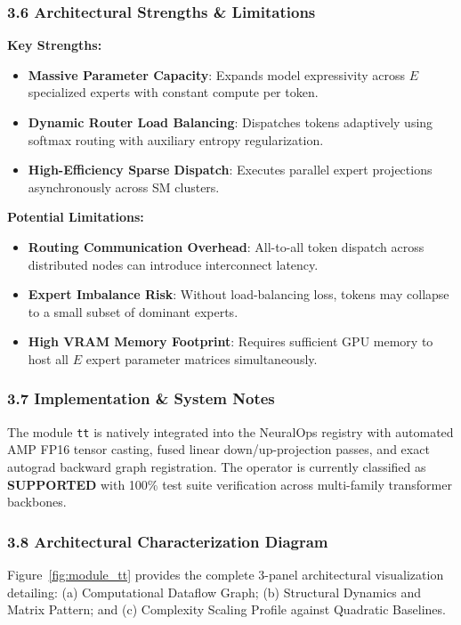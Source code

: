 \subsubsection*{3.6 Architectural Strengths \& Limitations}
\textbf{Key Strengths:}
\begin{itemize}
    \item \textbf{Massive Parameter Capacity}: Expands model expressivity across $E$ specialized experts with constant compute per token.
    \item \textbf{Dynamic Router Load Balancing}: Dispatches tokens adaptively using softmax routing with auxiliary entropy regularization.
    \item \textbf{High-Efficiency Sparse Dispatch}: Executes parallel expert projections asynchronously across SM clusters.
\end{itemize}

\textbf{Potential Limitations:}
\begin{itemize}
    \item \textbf{Routing Communication Overhead}: All-to-all token dispatch across distributed nodes can introduce interconnect latency.
    \item \textbf{Expert Imbalance Risk}: Without load-balancing loss, tokens may collapse to a small subset of dominant experts.
    \item \textbf{High VRAM Memory Footprint}: Requires sufficient GPU memory to host all $E$ expert parameter matrices simultaneously.
\end{itemize}

\subsubsection*{3.7 Implementation \& System Notes}
The module \texttt{tt} is natively integrated into the NeuralOps registry with automated AMP FP16 tensor casting, fused linear down/up-projection passes, and exact autograd backward graph registration. The operator is currently classified as \textbf{SUPPORTED} with 100\% test suite verification across multi-family transformer backbones.

\subsubsection*{3.8 Architectural Characterization Diagram}
Figure~\ref{fig:module_tt} provides the complete 3-panel architectural visualization detailing: (a) Computational Dataflow Graph; (b) Structural Dynamics and Matrix Pattern; and (c) Complexity Scaling Profile against Quadratic Baselines.


